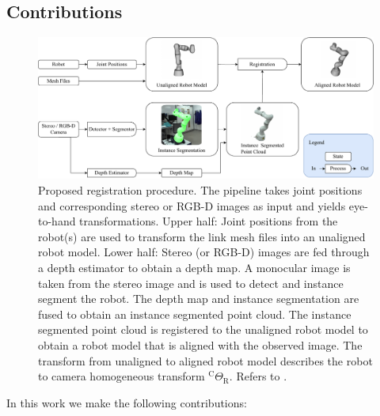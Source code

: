 


\subsection{Contributions}
\begin{figure}[tb]
    \centering
    \includegraphics[width=\textwidth]{chapter_1/fig/approach_refined.pdf}
    \caption{Proposed registration procedure. The pipeline takes joint positions and corresponding stereo or RGB-D images as input and yields eye-to-hand transformations. Upper half: Joint positions from the robot(s) are used to transform the link mesh files into an unaligned robot model. Lower half: Stereo (or RGB-D) images are fed through a depth estimator to obtain a depth map. A monocular image is taken from the stereo image and is used to detect and instance segment the robot. The depth map and instance segmentation are fused to obtain an instance segmented point cloud. The instance segmented point cloud is registered to the unaligned robot model to obtain a robot model that is aligned with the observed image. The transform from unaligned to aligned robot model describes the robot to camera homogeneous transform $^\text{C}\Theta_\text{R}$. Refers to .}
    \label{c1:fig:calibration_pipeline}
\end{figure}
In this work we make the following contributions:
